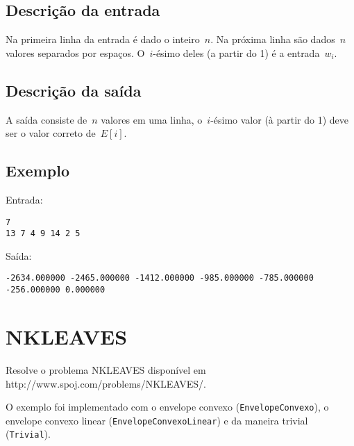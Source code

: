 \subsection*{Descrição da entrada}
Na primeira linha da entrada é dado o inteiro~$n$. Na próxima linha são dados~$n$ valores separados por espaços. O~$i$-ésimo deles (a partir do 1) é a entrada~$w_i$.

\subsection*{Descrição da saída}
A saída consiste de~$n$ valores em uma linha, o~$i$-ésimo valor (à partir do 1) deve ser o valor correto de~$E[i]$.

\subsection*{Exemplo}
Entrada:
\begin{verbatim}
7
13 7 4 9 14 2 5
\end{verbatim}
Saída:
\begin{verbatim}
-2634.000000 -2465.000000 -1412.000000 -985.000000 -785.000000 -256.000000 0.000000
\end{verbatim}


\section{NKLEAVES} \label{NKLEAVES}

Resolve o problema NKLEAVES disponível em http://www.spoj.com/problems/NKLEAVES/.

O exemplo foi implementado com o envelope convexo (\texttt{EnvelopeConvexo}), o envelope convexo linear (\texttt{EnvelopeConvexoLinear}) e da maneira trivial (\texttt{Trivial}).
